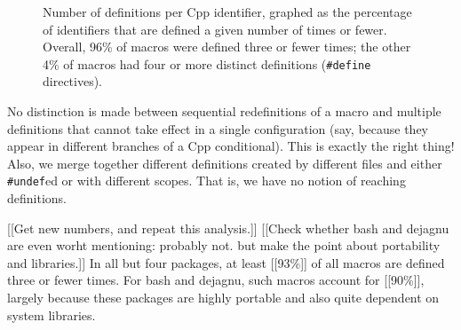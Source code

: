 \documentclass[10pt]{article}
\newcommand{\pkg}[1]{\textsf{#1}}
\begin{document}

        \begin{figure}
        \centerline{}
        \caption{Number of definitions per Cpp identifier, graphed as
          the percentage of identifiers that are defined a given number of times
          or fewer.  Overall, 96\% of macros were defined three or
          fewer times; the other 4\% of macros had four or more distinct
          definitions ({\tt \#define} directives).}
        \label{fig:freq-def-cat}
        \end{figure}



        
        No distinction is made between sequential redefinitions of a macro
        and multiple definitions that cannot take effect in a single
        configuration (say, because they appear in different branches of a
        Cpp conditional).  This is exactly the right thing!  Also, we merge
        together different definitions created by different files and
        either {\tt \#undef}ed or with different scopes.  That is, we have
        no notion of reaching definitions.
        

        [[Get new numbers, and repeat this analysis.]]  [[Check whether
        bash and dejagnu are even worht mentioning:  probably not.  but
        make the point about portability and libraries.]]
        In all but four packages, at least [[93\%]] of all macros are
        defined three or fewer times.  For \pkg{bash} and \pkg{dejagnu},
        such macros account for [[90\%]], largely because these packages
        are highly portable and also quite dependent on system libraries.
\end{document}

